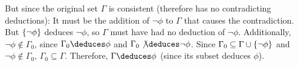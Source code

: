 \begin{Answer}
  But since the original set $\Gamma$ is consistent
  (therefore has no contradicting deductions):
  It must be the addition of $\lnot \phi$ to $\Gamma$
  that causes the contradiction. But $\left\{\lnot \phi\right\}$ deduces
  $\lnot \phi$, so $\Gamma$ must have had no deduction of $\lnot \phi$.
  Additionally, $\lnot \phi \notin \Gamma_0$, since
  $\Gamma_0 \deduces \phi$ and $\Gamma_0 \not \deduces \lnot \phi$.
  Since $\Gamma_0 \subseteq \Gamma \cup \left\{ \lnot \phi \right\}$
  and $\lnot \phi \notin \Gamma_0$, $\Gamma_0 \subseteq \Gamma$.
  Therefore, $\Gamma \deduces \phi$ (since its subset deduces $\phi$).


\end{Answer}
